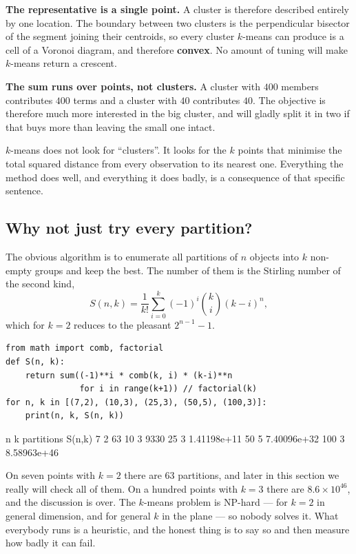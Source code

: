 \documentclass[11pt]{article}
\begin{document}
\textbf{The representative is a single point.} A cluster is therefore
described entirely by one location. The boundary between two clusters is the
perpendicular bisector of the segment joining their centroids, so every
cluster $k$-means can produce is a cell of a Voronoi diagram, and therefore
\textbf{convex}. No amount of tuning will make $k$-means return a crescent.

\textbf{The sum runs over points, not clusters.} A cluster with $400$ members
contributes $400$ terms and a cluster with $40$ contributes $40$. The
objective is therefore much more interested in the big cluster, and will
gladly split it in two if that buys more than leaving the small one intact.

\begin{keyidea}
$k$-means does not look for ``clusters''. It looks for the $k$ points that
minimise the total squared distance from every observation to its nearest
one. Everything the method does well, and everything it does badly, is a
consequence of that specific sentence.
\end{keyidea}

\subsection{Why not just try every partition?}

The obvious algorithm is to enumerate all partitions of $n$ objects into $k$
non-empty groups and keep the best. The number of them is the Stirling number
of the second kind,
\[
  S(n,k) = \frac{1}{k!}\sum_{i=0}^{k}(-1)^i\binom{k}{i}(k-i)^n ,
\]
which for $k = 2$ reduces to the pleasant $2^{n-1}-1$.

\begin{lstlisting}
from math import comb, factorial
def S(n, k):
    return sum((-1)**i * comb(k, i) * (k-i)**n
               for i in range(k+1)) // factorial(k)
for n, k in [(7,2), (10,3), (25,3), (50,5), (100,3)]:
    print(n, k, S(n, k))
\end{lstlisting}
\begin{codeout}
   n      k    partitions S(n,k)
     7      2    63
    10      3    9330
    25      3    1.41198e+11
    50      5    7.40096e+32
   100      3    8.58963e+46
\end{codeout}

On seven points with $k = 2$ there are $63$ partitions, and later in this
section we really will check all of them. On a hundred points with $k = 3$
there are $8.6 \times 10^{46}$, and the discussion is over. The $k$-means
problem is NP-hard --- for $k = 2$ in general dimension, and for general $k$
in the plane --- so nobody solves it. What everybody runs is a heuristic, and
the honest thing is to say so and then measure how badly it can fail.
\end{document}
